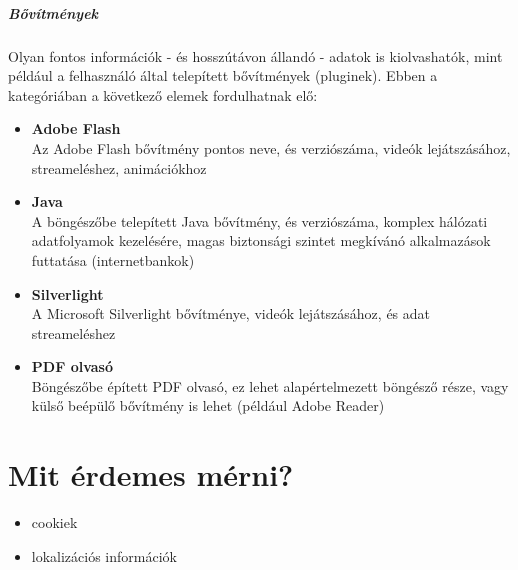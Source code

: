 \subparagraph{Bővítmények} %
\label{subp:bővítmények}
Olyan fontos információk - és hosszútávon állandó - adatok is kiolvashatók, mint például a felhasználó által telepített bővítmények (pluginek). Ebben a kategóriában a következő elemek fordulhatnak elő:
\begin{itemize}
	\item{\textbf{Adobe Flash}}\hfill\\ 
		Az Adobe Flash bővítmény pontos neve, és verziószáma, videók lejátszásához, streameléshez, animációkhoz
		
	\item{\textbf{Java}}\hfill\\ 
		A böngészőbe telepített Java bővítmény, és verziószáma, komplex hálózati adatfolyamok kezelésére, magas biztonsági szintet megkívánó alkalmazások futtatása (internetbankok)
	\item{\textbf{Silverlight}}\hfill\\ 
		A Microsoft Silverlight bővítménye, videók lejátszásához, és adat streameléshez
		
	\item{\textbf{PDF olvasó}}\hfill\\ 
		Böngészőbe épített PDF olvasó, ez lehet alapértelmezett böngésző része, vagy külső beépülő bővítmény is lehet (például Adobe Reader)
\end{itemize}






\section{Mit érdemes mérni?} %
\label{sec:mit_érdemes_mérni_}

\begin{itemize}
	\item cookiek
	\item lokalizációs információk
\end{itemize}

